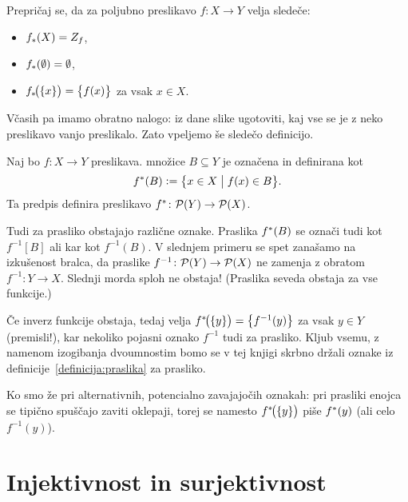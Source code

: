 \begin{vaja}
Prepričaj se, da za poljubno preslikavo $f\colon X \to Y$ velja sledeče:
\begin{itemize}
\item
$\img{f}{X} = \rn{f}$,
\item
$\img{f}{\emptyset} = \emptyset$,
\item
$\img[1]{f}{\set{x}} = \set[1]{f(x)}$ za vsak $x \in X$.
\end{itemize}
\end{vaja}


Včasih pa imamo obratno nalogo: iz dane slike ugotoviti, kaj vse se je z neko preslikavo vanjo preslikalo. Zato vpeljemo še sledečo definicijo.

\begin{definicija}\label{definicija:praslika}
Naj bo $f\colon X \to Y$ preslikava.  množice $B \subseteq Y$ je označena in definirana kot
\[\pim{f}{B} \dfeq \set[1]{x \in X}{f(x) \in B}.\]
Ta predpis definira preslikavo $\pim{f}\colon \pst(Y) \to \pst(X)$.
\end{definicija}

\begin{opomba}
Tudi za prasliko obstajajo različne oznake. Praslika $\pim{f}{B}$ se označi tudi kot $f^{-1}[B]$ ali kar kot $f^{-1}(B)$. V slednjem primeru se spet zanašamo na izkušenost bralca, da praslike $f^{-1}\colon \mathcal{P}(Y) \to \mathcal{P}(X)$ ne zamenja z obratom $f^{-1}\colon Y \to X$. Slednji morda sploh ne obstaja! (Praslika seveda obstaja za vse funkcije.)

Če inverz funkcije obstaja, tedaj velja $\pim[1]{f}{\set{y}} = \set[1]{f^{-1}(y)}$ za vsak $y \in Y$ (premisli!), kar nekoliko pojasni oznako $f^{-1}$ tudi za prasliko. Kljub vsemu, z namenom izogibanja dvoumnostim bomo se v tej knjigi skrbno držali oznake iz definicije~\ref{definicija:praslika} za prasliko.

Ko smo že pri alternativnih, potencialno zavajajočih oznakah: pri prasliki enojca se tipično spuščajo zaviti oklepaji, torej se namesto $\pim[1]{f}{\set{y}}$ piše $\pim{f}{y}$ (ali celo $f^{-1}(y)$).
\end{opomba}




\section{Injektivnost in surjektivnost}\label{razdelek:injektivnost-in-surjektivnost}

